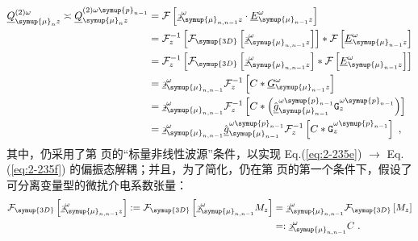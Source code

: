 \begin{subequations} \label{eq:2-235}
	\abovedisplayskip=13pt
	\belowdisplayskip=13pt
	\begin{align}
		{\underline{Q}}^{(2)\omega}_{{\symup{\mu}}_{n}z} \asymp {\underline{Q}}^{(2)\omega{\symup{p}}_{n-1}}_{{\symup{\mu}}_{n}z} &= \mathcal F \left[ \underline{\backepsilon}^{\omega}_{{\symup{\mu}}_{n,n-1}z} \cdot \underline{E}^{\omega}_{{\symup{\mu}}_{n-1}z} \right] \label{eq:2-235a} \\ &= \mathcal F_z^{-1} \left[ \mathcal F_{\symup{3D}} \left[ \underline{\backepsilon}^{\omega}_{{\symup{\mu}}_{n,n-1}z} \right] \right] * \mathcal F \left[ \underline{E}^{\omega}_{{\symup{\mu}}_{n-1}z} \right]  \label{eq:2-235b} \\ &= \mathcal F_z^{-1} \left[ \mathcal F_{\symup{3D}} \left[ \underline{\backepsilon}^{\omega}_{{\symup{\mu}}_{n,n-1}z} \right] * \mathcal F \left[ \underline{E}^{\omega}_{{\symup{\mu}}_{n-1}z} \right] \right] \label{eq:2-235c} \\ &= {\underline{\backepsilon}}^{\omega}_{{\symup{\mu}}_{n,n-1}} \mathcal F_z^{-1} \left[ C * \underline{G}^{\omega}_{{\symup{\mu}}_{n-1} z} \right] \label{eq:2-235d} \\ &= {\underline{\backepsilon}}^{\omega}_{{\symup{\mu}}_{n,n-1}} \mathcal F_z^{-1} \left[ C * \left( \hat{\underline{g}}^{\omega{\symup{p}}_{n-1}}_{{\symup{\mu}}_{n-1}} {\mathtt{G}}^{\omega{\symup{p}}_{n-1}}_{z} \right) \right] \label{eq:2-235e} \\ &= {\underline{\backepsilon}}^{\omega}_{{\symup{\mu}}_{n,n-1}} \hat{\underline{g}}^{\omega{\symup{p}}_{n-1}}_{{\symup{\mu}}_{n-1}} \mathcal F_z^{-1} \left[ C * {\mathtt{G}}^{\omega{\symup{p}}_{n-1}}_{z} \right] \label{eq:2-235f}~,
	\end{align}
\end{subequations}
其中，仍采用了第 \pageref{con:3} 页的“标量非线性波源”条件，以实现 Eq.(\ref{eq:2-235e}) $\to$ Eq.(\ref{eq:2-235f}) 的偏振态解耦；并且，为了简化，仍在第 \pageref{con:4} 页的第一个条件下，假设了可分离变量型的微扰介电系数张量：
\begin{subequations} \label{eq:2-236}
	\abovedisplayskip=13pt
	\belowdisplayskip=13pt
	\begin{align}
		\mathcal F_{\symup{3D}} \left[ \underline{\backepsilon}^{\omega}_{{\symup{\mu}}_{n,n-1}z} \right] := \mathcal F_{\symup{3D}} \left[ \underline{\backepsilon}^{\omega}_{{\symup{\mu}}_{n,n-1}} M_z \right] &= \underline{\backepsilon}^{\omega}_{{\symup{\mu}}_{n,n-1}} \mathcal F_{\symup{3D}} \left[ M_z \right] \label{eq:2-236a} \\ &=: \underline{\backepsilon}^{\omega}_{{\symup{\mu}}_{n,n-1}} C \label{eq:2-236b}~.
	\end{align}
\end{subequations}

